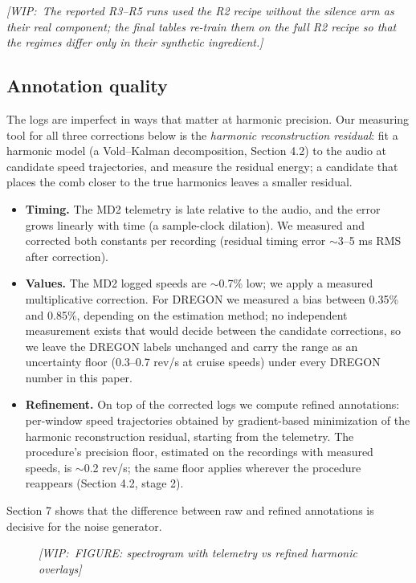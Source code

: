 \documentclass[journal]{IEEEtran}
\newcommand{\wip}[1]{{\color{gray!70!black}\textit{[WIP:~#1]}}}
\newcommand{\figbox}[1]{\framebox[\columnwidth]{\rule{0pt}{#1}}}
\begin{document}
\wip{The reported R3--R5 runs used the R2 recipe without the silence arm as
their real component; the final tables re-train them on the full R2 recipe
so that the regimes differ only in their synthetic ingredient.}

\subsection{Annotation quality}
\label{sec:annotation}

The logs are imperfect in ways that matter at harmonic precision. Our
measuring tool for all three corrections below is the \emph{harmonic
reconstruction residual}: fit a harmonic model (a Vold--Kalman decomposition,
Section 4.2) to the audio at candidate speed trajectories, and measure the
residual energy; a candidate that places the comb closer to the true
harmonics leaves a smaller residual.

\begin{itemize}
\item \textbf{Timing.} The MD2 telemetry is late relative to the audio, and
  the error grows linearly with time (a sample-clock dilation). We measured
  and corrected both constants per recording (residual timing error
  $\sim$3--5 ms RMS after correction).
\item \textbf{Values.} The MD2 logged speeds are $\sim$0.7\% low; we apply a
  measured multiplicative correction. For DREGON we measured a bias between
  0.35\% and 0.85\%, depending on the estimation method; no independent
  measurement exists that would decide between the candidate corrections, so
  we leave the DREGON labels unchanged and carry the range as an uncertainty
  floor (0.3--0.7 rev/s at cruise speeds) under every DREGON number in this
  paper.
\item \textbf{Refinement.} On top of the corrected logs we compute refined
  annotations: per-window speed trajectories obtained by gradient-based
  minimization of the harmonic reconstruction residual, starting from the
  telemetry. The procedure's precision floor, estimated on the recordings
  with measured speeds, is $\sim$0.2 rev/s; the same floor applies wherever
  the procedure reappears (Section 4.2, stage 2).
\end{itemize}

Section 7 shows that the difference between raw and refined annotations is
decisive for the noise generator.

\begin{figure}[t]
  \centering
  \figbox{7em}
  \caption{\wip{FIGURE: spectrogram with telemetry vs refined harmonic
      overlays}}
  \label{fig:comb-overlays}
\end{figure}
\end{document}
